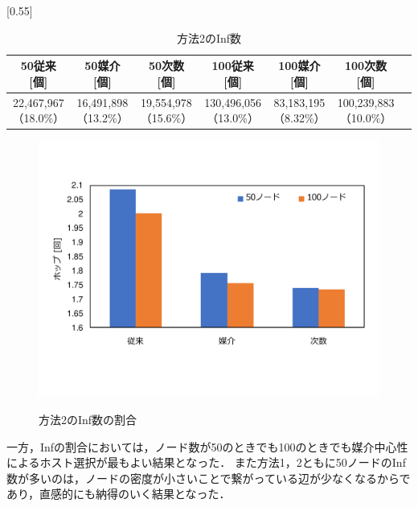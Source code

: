 \begin{table}[H]
    \centering
  \caption{方法2のInf数}
\scalebox{0.55}[0.55]{
  \begin{tabular}{c|c|c|c|c|c|c} \hline\hline
       50従来 [個] &50媒介 [個]&50次数 [個] &100従来 [個]& 100媒介 [個]& 100次数 [個] \\ \hline 
      22,467,967（18.0\%） & 16,491,898（13.2\%） &19,554,978（15.6\%）& 130,496,056（13.0\%） & 83,183,195（8.32\%）& 100,239,883（10.0\%） \\ \hline\hline
  \end{tabular}
  }
  \label{tab:2_inf}
\end{table}

\begin{figure}[H]
  \centering
  \includegraphics[width=1\textwidth]{figures/2inf.pdf}
  \label{fig:2Inf}
      \vspace{-20mm}
    \caption{方法2のInf数の割合}
\end{figure}

一方，Infの割合においては，ノード数が50のときでも100のときでも媒介中心性によるホスト選択が最もよい結果となった．
また方法1，2ともに50ノードのInf数が多いのは，ノードの密度が小さいことで繋がっている辺が少なくなるからであり，直感的にも納得のいく結果となった．



